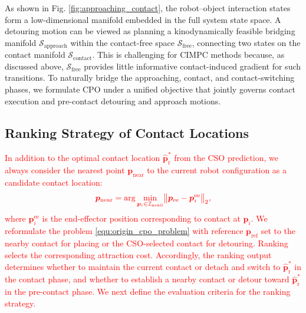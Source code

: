 As shown in Fig. \ref{fig:approaching_contact}, the robot--object interaction states form a low-dimensional manifold embedded in the full system state space. A detouring motion can be viewed as planning a kinodynamically feasible bridging manifold $\mathcal{S}_{\text{approach}}$ within the contact-free space $\mathcal{S}_{\text{free}}$, connecting two states on the contact manifold $\mathcal{S}_{\text{contact}}$. This is challenging for CIMPC methods because, as discussed above, $\mathcal{S}_{\text{free}}$ provides little informative contact-induced gradient for such transitions. To naturally bridge the approaching, contact, and contact-switching phases, we formulate CPO under a unified objective that jointly governs contact execution and pre-contact detouring and approach motions.

\subsection{Ranking Strategy of Contact Locations}
\label{sec:cpo-ranking_strategy}

\textcolor{red}{
In addition to the optimal contact location $\boldsymbol{\hat{p}}^*_{\text{r}}$ from the CSO prediction, we always consider the nearest point $\boldsymbol{p}_{\text{near}}$ to the current robot configuration as a candidate contact location:
\begin{equation}\label{equ:nearest}
\textcolor{red}{
\boldsymbol{p}_{\mathrm{near}}
=\arg\min_{\boldsymbol{p}_i\in\mathcal{I}_{\mathrm{avail}}}
\bigl\|\boldsymbol{p}_{\mathrm{ee}}
-\boldsymbol{p}^{\mathrm{ee}}_i\bigr\|_2,
}
\end{equation}
\noindent where $\boldsymbol{p}^{\mathrm{ee}}_i$ is the end-effector position
corresponding to contact at $\boldsymbol{p}_i$. We reformulate the problem \eqref{equ:origin_cpo_problem} \textcolor{red}{with reference $\boldsymbol{p}_{\text{ref}}$ set to the nearby contact for placing or the CSO-selected contact for detouring. Ranking selects the corresponding attraction cost.} Accordingly, the ranking output determines whether to maintain the current contact or detach and switch to $\boldsymbol{\hat{p}}^*_{\mathrm{r}}$ in the contact phase, and whether to establish a nearby contact or detour toward $\boldsymbol{\hat{p}}^*_{\mathrm{r}}$ in the pre-contact phase. We next define the evaluation criteria for the ranking strategy.
}

